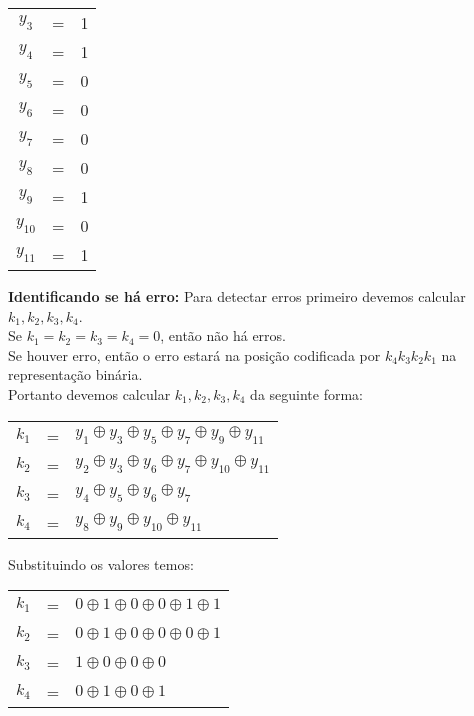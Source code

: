 \documentclass[12pt]{article}
\begin{document}
\begin{itemize}
\begin{center}
\begin{tabular}{ccc}
					$y_3$ & = & 1\\
					$y_4$ & = & 1\\
					$y_5$ & = & 0\\
					$y_6$ & = & 0\\
					$y_7$ & = & 0\\
					$y_8$ & = & 0\\
					$y_9$ & = & 1\\
					$y_{10}$ & = & 0\\
					$y_{11}$ & = & 1\\
				\end{tabular}
			\end{center}
			\textbf{Identificando se há erro:}
					\hfill\newline\hfill\newline
					Para detectar erros primeiro devemos calcular $k_1, k_2, k_3, k_4$.\\
					Se $k_1 = k_2 = k_3 = k_4 = 0$, então não há erros.\\
					Se houver erro, então o erro estará na posição codificada  por $k_4k_3k_2k_1$
					na representação binária.\\
					Portanto devemos calcular $k_1, k_2, k_3, k_4$ da seguinte forma:
					\begin{center}
						\begin{tabular}{ccl}
							$k_1$ & = & $y_1 \oplus y_3 \oplus y_5 \oplus y_7 \oplus y_9 \oplus y_{11}$\\
							$k_2$ & = & $y_2 \oplus y_3 \oplus y_6 \oplus y_7 \oplus y_{10} \oplus y_{11}$\\
							$k_3$& = & $y_4 \oplus y_5 \oplus y_6 \oplus y_7$\\
							$k_4$ & = & $y_8 \oplus y_9 \oplus y_{10} \oplus y_{11}$\\
						\end{tabular}
					\end{center}
					Substituindo os valores temos:
					\begin{center}
						\begin{tabular}{ccl}
							$k_1$ & = & $0 \oplus 1 \oplus 0 \oplus 0 \oplus 1 \oplus 1$\\
							$k_2$ & = & $0 \oplus 1 \oplus 0 \oplus 0 \oplus 0 \oplus 1$\\
							$k_3$& = & $1 \oplus 0 \oplus 0 \oplus 0$\\
							$k_4$ & = & $0 \oplus 1 \oplus 0 \oplus 1$\\
						\end{tabular}
					\end{center}

\end{itemize}
\end{document}
